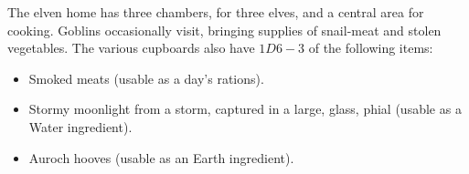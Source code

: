 \begin{multicols}{2}
The elven home has three chambers, for three elves, and a central area for cooking.
Goblins occasionally visit, bringing supplies of snail-meat and stolen vegetables.
The various cupboards also have $1D6-3$ of the following items:

\begin{itemize}
  \item
  Smoked meats (usable as a day's \glspl{ration}).
  \item
  Stormy moonlight from a storm, captured in a large, glass, phial (usable as a Water \gls{ingredient}).
  \item
  Auroch hooves (usable as an Earth \gls{ingredient}).
\end{itemize}

\elf

\end{multicols}

\stopcontents[sq]
